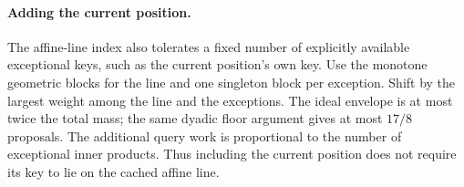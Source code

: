 \paragraph{Adding the current position.}
The affine-line index also tolerates a fixed number of explicitly
available exceptional keys, such as the current position's own key.
Use the monotone geometric blocks for the line and one singleton
block per exception. Shift by the largest weight among the line and
the exceptions. The ideal envelope is at most twice the total mass;
the same dyadic floor argument gives at most $17/8$ proposals.
The additional query work is proportional to the number of exceptional
inner products. Thus including the current position does not require
its key to lie on the cached affine line.
